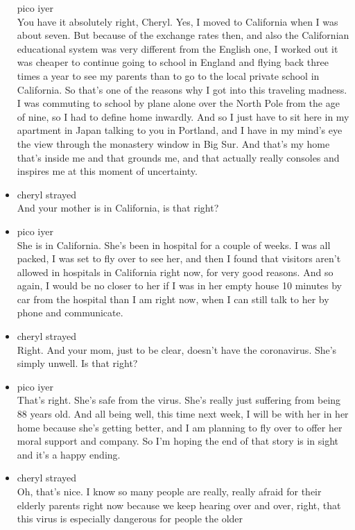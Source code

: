 \begin{itemize}
  pico iyer\\
  You have it absolutely right, Cheryl. Yes, I moved to California when
  I was about seven. But because of the exchange rates then, and also
  the Californian educational system was very different from the English
  one, I worked out it was cheaper to continue going to school in
  England and flying back three times a year to see my parents than to
  go to the local private school in California. So that's one of the
  reasons why I got into this traveling madness. I was commuting to
  school by plane alone over the North Pole from the age of nine, so I
  had to define home inwardly. And so I just have to sit here in my
  apartment in Japan talking to you in Portland, and I have in my mind's
  eye the view through the monastery window in Big Sur. And that's my
  home that's inside me and that grounds me, and that actually really
  consoles and inspires me at this moment of uncertainty.
\item
  cheryl strayed\\
  And your mother is in California, is that right?
\item
  pico iyer\\
  She is in California. She's been in hospital for a couple of weeks. I
  was all packed, I was set to fly over to see her, and then I found
  that visitors aren't allowed in hospitals in California right now, for
  very good reasons. And so again, I would be no closer to her if I was
  in her empty house 10 minutes by car from the hospital than I am right
  now, when I can still talk to her by phone and communicate.
\item
  cheryl strayed\\
  Right. And your mom, just to be clear, doesn't have the coronavirus.
  She's simply unwell. Is that right?
\item
  pico iyer\\
  That's right. She's safe from the virus. She's really just suffering
  from being 88 years old. And all being well, this time next week, I
  will be with her in her home because she's getting better, and I am
  planning to fly over to offer her moral support and company. So I'm
  hoping the end of that story is in sight and it's a happy ending.
\item
  cheryl strayed\\
  Oh, that's nice. I know so many people are really, really afraid for
  their elderly parents right now because we keep hearing over and over,
  right, that this virus is especially dangerous for people the older

\end{itemize}
